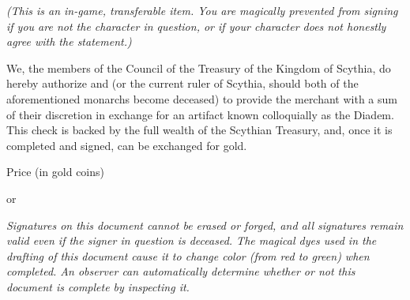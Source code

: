 \documentclass[white]{Kos}
\begin{document}
\name{\wScythiaCheck{}}

\emph{(This is an in-game, transferable item. You are magically prevented from signing if you are not the character in question, or if your character does not honestly agree with the statement.)}

We, the members of the Council of the Treasury of the Kingdom of Scythia, do hereby authorize \cScythiaKing{\Monarch} \cScythiaKing{\MYname} and \cScythiaQueen{\Monarch} \cScythiaQueen{\MYname}  (or the current ruler of Scythia, should both of the aforementioned monarchs become deceased) to provide the merchant \cMerchant {\MYname} with a sum of their discretion in exchange for an artifact known colloquially as the Diadem. This check is backed by the full wealth of the Scythian Treasury, and, once it is completed and signed, can be exchanged for gold.

\hrulefill

Price (in gold coins)

\hrulefill

\cScythiaKing{\Monarch} \cScythiaKing{\MYname} or \cScythiaQueen{\Monarch} \cScythiaQueen{\MYname}

\hrulefill

\cMerchant{\MYname}

\emph{Signatures on this document cannot be erased or forged, and all signatures remain valid even if the signer in question is deceased. The magical dyes used in the drafting of this document cause it to change color (from red to green) when completed. An observer can automatically determine whether or not this document is complete by inspecting it.}
\end{document}
